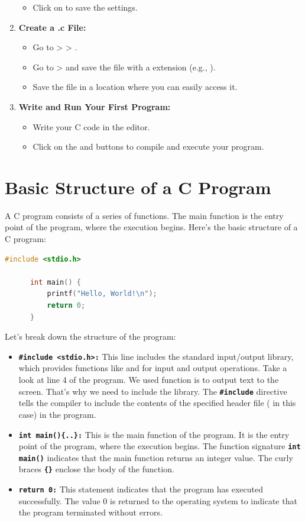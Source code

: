 \documentclass[12pt, openany]{book}
\newcommand{\code}[1]{\colorbox{gray!20}{\textbf{\texttt{#1}}}}
\begin{document}
\begin{enumerate}
\begin{itemize}
          \item Click on  to save the settings.
      \end{itemize}
      \item \textbf{Create a .c File:}
      \begin{itemize}
          \item Go to  \textgreater{}  \textgreater{} .
          \item Go to  \textgreater{}  and save the file with a  extension (e.g., ).
          \item Save the file in a location where you can easily access it.
      \end{itemize}
      \item \textbf{Write and Run Your First Program:}
      \begin{itemize}
          \item Write your C code in the editor.
          \item Click on the  and  buttons to compile and execute your program.
      \end{itemize}
  \end{enumerate}
  
  \section{Basic Structure of a C Program}
  A C program consists of a series of functions. The main function is the entry point of the program, where the execution begins. Here's the basic structure of a C program:
  \begin{lstlisting}[language=C, caption=Basic Structure of a C Program]
      #include <stdio.h>
      
      int main() {
          printf("Hello, World!\n");
          return 0;
      }
  \end{lstlisting}
  \noindent Let's break down the structure of the program:
  \begin{itemize}
      \item \code{\#include <stdio.h>:} This line includes the standard input/output library, which provides functions like  and  for input and output operations. Take a look at line 4 of the program. We used  function is to output text to the screen. That's why we need to include the  library. The \code{\#include} directive tells the compiler to include the contents of the specified header file ( in this case) in the program.
      \item \code{int main()\{..\}:} This is the main function of the program. It is the entry point of the program, where the execution begins. The function signature \code{int main()} indicates that the main function returns an integer value. The curly braces \code{\{\}} enclose the body of the function.
      \item \code{return 0:} This statement indicates that the program has executed successfully. The value 0 is returned to the operating system to indicate that the program terminated without errors.
  \end{itemize}
  
\end{document}
